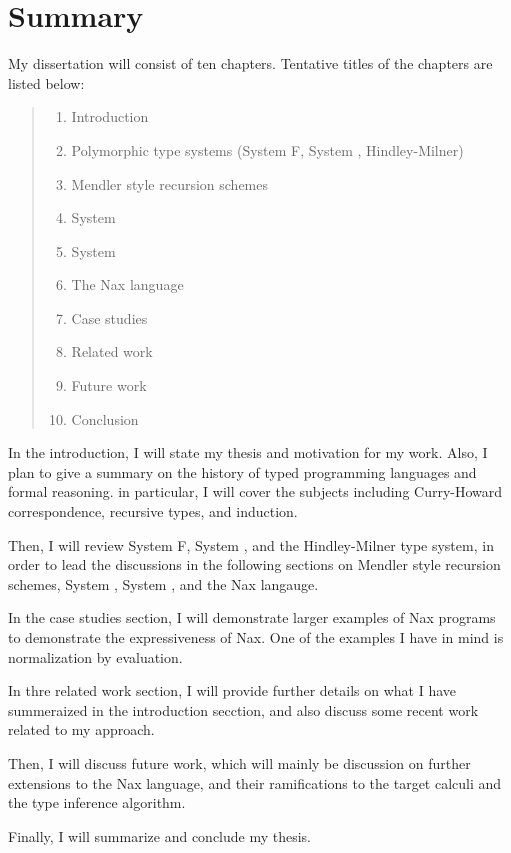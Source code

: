 \section{Summary}\label{sec:summary}
My dissertation will consist of ten chapters.
Tentative titles of the chapters are listed below:
\begin{quote}
\begin{enumerate}[1.]
\item Introduction
\item Polymorphic type systems (System \textsf{F}, System \Fw, Hindley-Milner)
\item Mendler style recursion schemes
\item System \Fi
\item System \Fixi
\item The Nax language
\item Case studies
\item Related work
\item Future work
\item Conclusion
\end{enumerate}
\end{quote}

In the introduction, I will state my thesis and motivation for my work.
Also, I plan to give a summary on the history of typed programming languages
and formal reasoning. in particular, I will cover the subjects including
Curry-Howard correspondence, recursive types, and induction.

Then, I will review System \textsf{F}, System \Fw, and the Hindley-Milner
type system, in order to lead the discussions in the following sections
on Mendler style recursion schemes, System \Fi, System \Fixi, and
the Nax langauge.

In the case studies section, I will demonstrate larger examples of Nax programs
to demonstrate the expressiveness of Nax. One of the examples I have in mind
is normalization by evaluation.

In thre related work section, I will provide further details on what I have
summeraized in the introduction secction, and also discuss some recent work
related to my approach.

Then, I will discuss future work, which will mainly be discussion on further
extensions to the Nax language, and their ramifications to
the target calculi and the type inference algorithm.

Finally, I will summarize and conclude my thesis.


